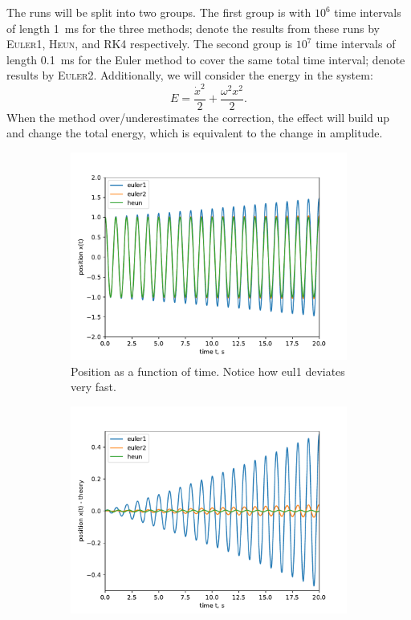 \documentclass[]{article}
\newcommand{\eulerOne}{\textsc{Euler1}}
\newcommand{\eulerTwo}{\textsc{Euler2}}
\newcommand{\heun}{\textsc{Heun}}
\newcommand{\rkFour}{\textsc{RK4}}
\begin{document}
	The runs will be split into two groups. The first group is with $10^6$ time intervals of length \SI{1}{ms} for the three methods; denote the results from these runs by \eulerOne{}, \heun{}, and \rkFour{} respectively. The second group is $10^7$ time intervals of length \SI{0.1}{ms} for the Euler method to cover the same total time interval; denote results by \eulerTwo{}. Additionally, we will consider the energy in the system:
	\begin{equation}
		E = \frac{\dot{x}^2}{2} + \frac{\omega^2 x^2}{2}.
	\end{equation}
	When the method over/underestimates the correction, the effect will build up and change the total energy, which is equivalent to the change in amplitude.

	\begin{figure}[!htb]
		\hfill
		\begin{subfigure}[t]{0.48\textwidth}
			\centering
			\includegraphics[width=\textwidth]{figures/eul12+heun.pdf}
			\caption{Position as a function of time. Notice how eul1 deviates very fast.\label{subfig:sho-pos}}
		\end{subfigure}
		\hfill
		\begin{subfigure}[t]{0.48\textwidth}
			\centering
			\includegraphics[width=\textwidth]{figures/eul12+heun-theory.pdf}

\end{subfigure}
\end{figure}
\end{document}
